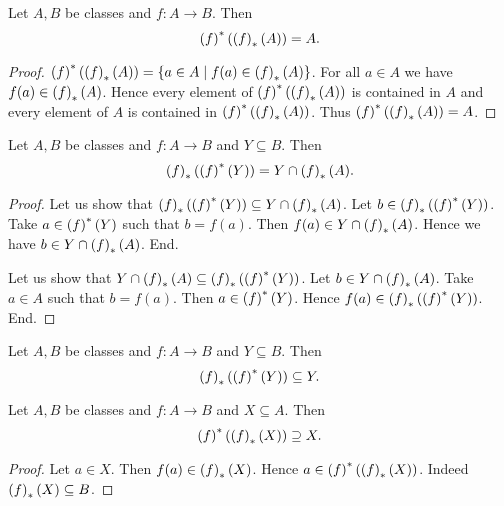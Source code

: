 \documentclass[../../set-theory/set-theory.tex]{subfiles}
\begin{document}
  \begin{forthel}
    \begin{proposition}
      Let $A, B$ be classes and $f : A \to B$.
      Then \[ \left(f\right)^{*}(\left(f\right)_{*}(A)) = A. \]
    \end{proposition}
    \begin{proof}
      $\left(f\right)^{*}(\left(f\right)_{*}(A)) = \{ a \in A \mid f(a) \in \left(f\right)_{*}(A) \}$.
      For all $a \in A$ we have $f(a) \in \left(f\right)_{*}(A)$.
      Hence every element of $\left(f\right)^{*}(\left(f\right)_{*}(A))$ is contained in $A$ and every
      element of $A$ is contained in $\left(f\right)^{*}(\left(f\right)_{*}(A))$.
      Thus $\left(f\right)^{*}(\left(f\right)_{*}(A)) = A$.
    \end{proof}
  \end{forthel}

  \begin{forthel}
    \begin{proposition}
      Let $A, B$ be classes and $f : A \to B$ and $Y \subseteq B$.
      Then \[ \left(f\right)_{*}(\left(f\right)^{*}(Y)) = Y \cap \left(f\right)_{*}(A). \]
    \end{proposition}
    \begin{proof}
      Let us show that $\left(f\right)_{*}(\left(f\right)^{*}(Y)) \subseteq Y \cap \left(f\right)_{*}(A)$.
        Let $b \in \left(f\right)_{*}(\left(f\right)^{*}(Y))$.
        Take $a \in \left(f\right)^{*}(Y)$ such that $b = f(a)$.
        Then $f(a) \in Y \cap \left(f\right)_{*}(A)$.
        Hence we have $b \in Y \cap \left(f\right)_{*}(A)$.
      End.

      Let us show that $Y \cap \left(f\right)_{*}(A) \subseteq \left(f\right)_{*}(\left(f\right)^{*}(Y))$.
        Let $b \in Y \cap \left(f\right)_{*}(A)$.
        Take $a \in A$ such that $b = f(a)$.
        Then $a \in \left(f\right)^{*}(Y)$.
        Hence $f(a) \in \left(f\right)_{*}(\left(f\right)^{*}(Y))$.
      End.
    \end{proof}
  \end{forthel}

  \begin{forthel}
    \begin{corollary}
      Let $A, B$ be classes and $f : A \to B$ and $Y \subseteq B$.
      Then \[ \left(f\right)_{*}(\left(f\right)^{*}(Y)) \subseteq Y. \]
    \end{corollary}
  \end{forthel}

  \begin{forthel}
    \begin{proposition}
      Let $A, B$ be classes and $f : A \to B$ and $X \subseteq A$.
      Then \[ \left(f\right)^{*}(\left(f\right)_{*}(X)) \supseteq X. \]
    \end{proposition}
    \begin{proof}
      Let $a \in X$.
      Then $f(a) \in \left(f\right)_{*}(X)$.
      Hence $a \in \left(f\right)^{*}(\left(f\right)_{*}(X))$.
      Indeed $\left(f\right)_{*}(X) \subseteq B$.
    \end{proof}
  \end{forthel}
\end{document}
